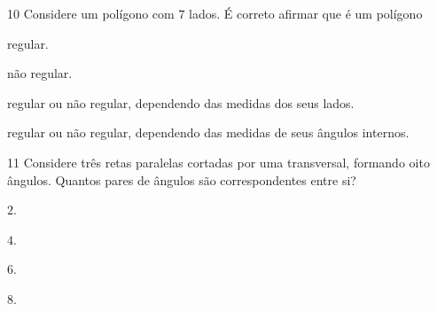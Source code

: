 
\num{10} Considere um polígono com $7$ lados. É correto afirmar que é
um polígono

\begin{escolha}
\item regular.
\item não regular.
\item regular ou não regular, dependendo das medidas dos seus lados.
\item regular ou não regular, dependendo das medidas de seus ângulos internos.
\end{escolha}



\num{11} Considere três retas paralelas cortadas por uma transversal,
formando oito ângulos. Quantos pares de ângulos são correspondentes
entre si?

\begin{multicols}{2}
\begin{escolha}
\item $2$.
\item $4$.
\item $6$.
\item $8$.
\end{escolha}
\end{multicols}

